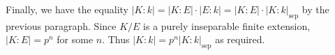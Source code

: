 \documentclass[12pt]{article}
\theoremstyle{definitionstyle}
\newcommand{\sepdeg}[1]{|#1|_{\mathrm{sep}}}
\begin{document}
\begin{enumerate}[leftmargin=\labelsep]
		Finally, we have the equality $|K : k| = |K : E| \cdot |E : k| = |K : E| \cdot \sepdeg{K : k}$ by the previous paragraph. Since $K/E$ is a purely inseparable finite extension, $|K : E| = p^n$ for some $n$. Thus $|K : k| = p^n \sepdeg{K : k}$ as required.
	\end{enumerate}
\end{document}
